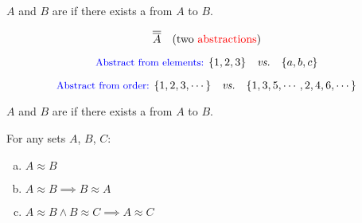 
\begin{frame}{}
\end{frame}

\begin{frame}{}
  \begin{definition}[$|A| = |B| \;(A \approx B)$ (1878)]
    $A$ and $B$ are 
    if there exists a  from $A$ to $B$.
  \end{definition}

  \pause
  \[
    \overline{\overline{A}} \quad \text{(two \textcolor{red}{abstractions})}
  \]

  \pause
  \[
    \text{\textcolor{blue}{\small Abstract from elements: }} \{1,2,3\} \quad \text{\it vs.} \quad \{a,b,c\}
  \]

  \pause
  \[
    \text{\textcolor{blue}{\small Abstract from order: }} \{1,2,3,\cdots\} \quad \text{\it vs.} \quad \{1,3,5,\cdots, 2,4,6,\cdots\}
  \]
\end{frame}

\begin{frame}{}
  \begin{definition}[$|A| = |B| \;(A \approx B)$ (1878)]
    $A$ and $B$ are  if there exists a  from $A$ to $B$.
  \end{definition}

  \vspace{0.30cm}
  \begin{center}
  \end{center}

  \pause
  \begin{theorem}
    For any sets $A$, $B$, $C$:
    \begin{enumerate}[(a)]
      \item $A \approx B$
      \item $A \approx B \implies B \approx A$
      \item $A \approx B \land B \approx C \implies A \approx C$
    \end{enumerate}
  \end{theorem}

  \vspace{0.30cm}
\end{frame}


